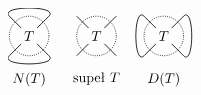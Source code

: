 \[
	\begin{tikzpicture}[baseline=-0.65ex, scale=0.1]
	\useasboundingbox (-5, -11) rectangle (5, 7);
		\draw[semithick] (-2, -2) to (-5,-5);
		\draw[semithick] (2, 2) to (5,5);
		\draw[semithick] (2, -2) to (5,-5);
		\draw[semithick] (-2, 2) to (-5,5);		%
		\draw[semithick, densely dotted] (-0, 0) circle (5);
		\node at (0, 0) {$T$};
		\node [below] at (0, -8) {$N(T)$};
		\draw[semithick] (-5, -5) [in=-45, out=-135] to (5, -5);		%
		\draw[semithick] (-5,	5) [in=45, out=135] to (5, 5);		%
	\end{tikzpicture}
	\quad \quad
	\begin{tikzpicture}[baseline=-0.65ex, scale=0.1]
	\useasboundingbox (-5, -11) rectangle (5, 7);
		\draw[semithick] (-2, -2) to (-5,-5);
		\draw[semithick] (2, 2) to (5,5);
		\draw[semithick] (2, -2) to (5,-5);
		\draw[semithick] (-2, 2) to (-5,5);		%
		\draw[semithick, densely dotted] (-0, 0) circle (5);
		\node at (0, 0) {$T$};
		\node [below] at (0, -8) {supeł $T$};
	\end{tikzpicture}
	\quad \quad
	\begin{tikzpicture}[baseline=-0.65ex, scale=0.1]
	\useasboundingbox (-5, -11) rectangle (5, 7);
		\draw[semithick] (-2, -2) to (-5,-5);
		\draw[semithick] (2, 2) to (5,5);
		\draw[semithick] (2, -2) to (5,-5);
		\draw[semithick] (-2, 2) to (-5,5);		%
		\draw[semithick, densely dotted] (-0, 0) circle (5);
		\node at (0, 0) {$T$};
		\node [below] at (0, -8) {$D(T)$};
		\draw[semithick] (-5, -5) [in=135, out=-135] to (-5, 5);		%
		\draw[semithick] (5, -5) [in=45, out=-45] to (5, 5);		%
	\end{tikzpicture}
	\quad \quad
\]
